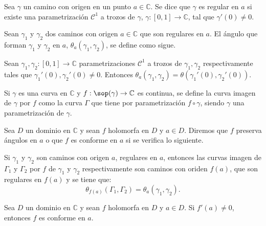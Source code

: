 \begin{definition}
    Sea $\gamma$ un camino con origen en un punto $a \in \mathbb{C}$.
    Se dice que $\gamma$ es regular en $a$ si existe una parametrización $\mathcal{C}^1$ a trozos de $\gamma$, $\gamma: [0, 1] \to \mathbb{C}$, tal que $\gamma'(0) \neq 0$.
\end{definition}

\begin{definition}
    Sean $\gamma_1$ y $\gamma_2$ dos caminos con origen $a \in \mathbb{C}$ que son regulares en $a$.
    El ángulo que forman $\gamma_1$ y $\gamma_2$ en $a$, $\theta_a(\gamma_1, \gamma_2)$, se define como sigue.

    Sean $\gamma_1, \gamma_2: [0, 1] \to \mathbb{C}$ parametrizaciones $\mathcal{C}^1$ a trozos de $\gamma_1, \gamma_2$ respectivamente tales que $\gamma_1'(0), \gamma_2'(0) \neq 0$.
    Entonces $\theta_a(\gamma_1, \gamma_2) = \theta(\gamma_1'(0), \gamma_2'(0))$.
\end{definition}

\begin{definition}
    Si $\gamma$ es una curva en $\mathbb{C}$ y $f: \sop(\gamma) \to \mathbb{C}$ es continua, se define la curva imagen de $\gamma$ por $f$ como la curva $\Gamma$ que tiene por parametrización $f \circ \gamma$, siendo $\gamma$ una parametrización de $\gamma$.
\end{definition}

\begin{definition}
    Sea $D$ un dominio en $\mathbb{C}$ y sean $f$ holomorfa en $D$ y $a \in D$.
    Diremos que $f$ preserva ángulos en $a$ o que $f$ es conforme en $a$ si se verifica lo siguiente.

    Si $\gamma_1$ y $\gamma_2$ son caminos con origen $a$, regulares en $a$, entonces las curvas imagen de $\Gamma_1$ y $\Gamma_2$ por $f$ de $\gamma_1$ y $\gamma_2$ respectivamente son caminos con oriden $f(a)$, que son regulares en $f(a)$ y se tiene que:
    $$\theta_{f(a)}(\Gamma_1, \Gamma_2) = \theta_a(\gamma_1, \gamma_2).$$
\end{definition}

\begin{theorem}
    Sea $D$ un dominio en $\mathbb{C}$ y sean $f$ holomorfa en $D$ y $a \in D$.
    Si $f'(a) \neq 0$, entonces $f$ es conforme en $a$.
\end{theorem}

